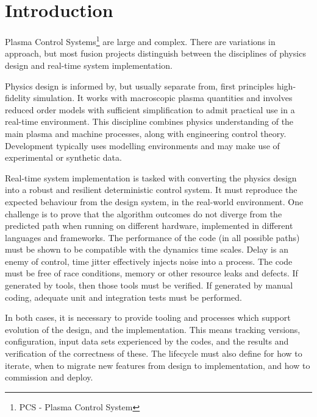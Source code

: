 \documentclass[5p]{elsarticle}
\begin{document}

\section{Introduction}
\label{sec:intro}


Plasma Control Systems\footnote{PCS - Plasma Control System} are large and complex.
There are variations in approach, but most fusion projects distinguish between
the disciplines of physics design and real-time system implementation.

Physics design is informed by, but usually separate from, first principles 
high-fidelity simulation. It works with macroscopic plasma quantities
and involves reduced order models with sufficient simplification to admit
practical use in a real-time environment.  This discipline combines
physics understanding of the main plasma and machine processes, along
with engineering control theory. Development typically uses modelling 
environments and may make use of experimental or synthetic data.

Real-time system implementation is tasked with converting the physics design
into a robust and resilient deterministic control system.  It must reproduce
the expected behaviour from the design system, in the real-world environment.
One challenge is to prove that the algorithm outcomes do not diverge from
the predicted path when running on different hardware, implemented in different
languages and frameworks. The performance of the code (in all possible paths) 
must be shown to be compatible with the dynamics time scales.  Delay is an enemy of 
control, time jitter effectively injects noise into a process.
The code must be free of race conditions, memory or other resource leaks
and defects.  If generated by tools, then those tools must be verified.
If generated by manual coding, adequate unit and integration tests must
be performed. 

In both cases, it is necessary to provide tooling and processes which support
evolution of the design, and the implementation.  This means tracking versions,
configuration, input data sets experienced by the codes, and the results and
verification of the correctness of these.  The lifecycle must also define
for how to iterate, when to migrate new features from design to implementation,
and how to commission and deploy.
\end{document}
